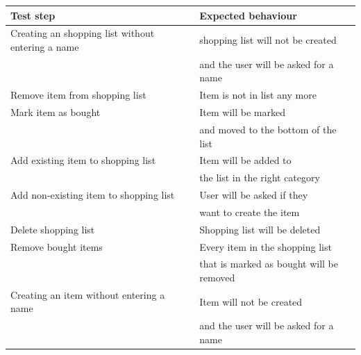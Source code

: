 \documentclass[12pt]{article}
\theoremstyle{definition}
\begin{document}
\begin{tabular}{|l|l|}
\hline
Test step & Expected behaviour \\ \hline
Creating an shopping list without entering a name & shopping list will not be created \\ 
 & and the user will be asked for a name \\ \hline
Remove item from shopping list & Item is not in list any more \\ \hline
Mark item as bought & Item will be marked \\
& and moved to the bottom of the list \\ \hline
Add existing item to shopping list & Item will be added to \\
& the list in the right category \\ \hline
Add non-existing item to shopping list & User will be asked if they \\
& want to create the item \\ \hline
Delete shopping list & Shopping list will be deleted \\ \hline
Remove bought items & Every item in the shopping list \\
& that is marked as bought will be removed \\ \hline
Creating an item without entering a name & Item will not be created \\ 
 & and the user will be asked for a name \\ \hline

\end{tabular}

\pagebreak
\end{document}
